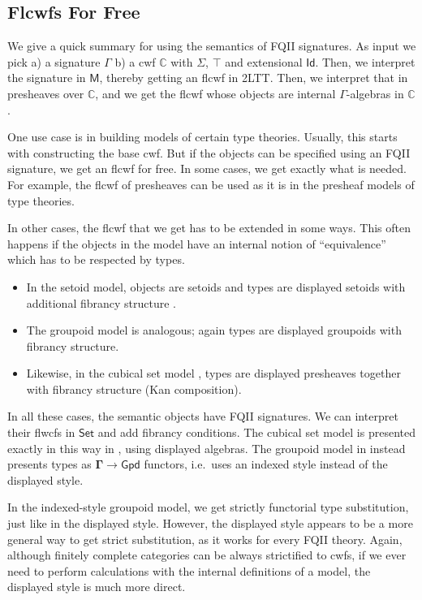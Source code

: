 \documentclass[12pt,a4paper,twoside,openany]{book}
\theoremstyle{remark}
\theoremstyle{definition}
\theoremstyle{theorem}
\newcommand{\ms}[1]{\mathsf{#1}}
\newcommand{\mbb}[1]{\mathbb{#1}}
\newcommand{\bs}[1]{\boldsymbol{#1}}
\newcommand{\Id}{\mathsf{Id}}
\newcommand{\Set}{\mathsf{Set}}
\newcommand{\bM}{\bs{\mathsf{M}}}
\newcommand{\mbbC}{\mbb{C}}
\begin{document}
\subsection{Flcwfs For Free}

We give a quick summary for using the semantics of FQII signatures. As input we
pick a) a signature $\Gamma$ b) a cwf $\mbbC$ with $\Sigma$, $\top$ and
extensional $\Id$. Then, we interpret the signature in $\bM$, thereby getting an
flcwf in 2LTT. Then, we interpret that in presheaves over $\mbbC$, and we get
the flcwf whose objects are internal $\Gamma$-algebras in $\mbbC$.

One use case is in building models of certain type theories. Usually, this
starts with constructing the base cwf. But if the objects can be specified using
an FQII signature, we get an flcwf for free. In some cases, we get exactly
what is needed. For example, the flcwf of presheaves can be used as it is in the
presheaf models of type theories.

In other cases, the flcwf that we get has to be extended in some
ways. This often happens if the objects in the model have an internal notion of
``equivalence'' which has to be respected by types.
\begin{itemize}
  \item In the setoid model, objects are setoids and types are displayed
    setoids with additional fibrancy structure \cite{setoidtt}.
  \item The groupoid model \cite{hofmann96groupoidmodel} is analogous; again types are displayed groupoids
    with fibrancy structure.
  \item Likewise, in the cubical set model \cite{cubical}, types are displayed
    presheaves together with fibrancy structure (Kan composition).
\end{itemize}

In all these cases, the semantic objects have FQII signatures. We can interpret
their flwcfs in $\bs{\Set}$ and add fibrancy conditions. The cubical set model
is presented exactly in this way in \cite{cubical}, using displayed
algebras. The groupoid model in \cite{hofmann96groupoidmodel} instead presents
types as $\bs{\Gamma} \to \bs{\ms{Gpd}}$ functors, i.e.\ uses an indexed style
instead of the displayed style.

In the indexed-style groupoid model, we get strictly functorial type
substitution, just like in the displayed style. However, the displayed style
appears to be a more general way to get strict substitution, as it works for
every FQII theory. Again, although finitely complete categories can be always
strictified to cwfs, if we ever need to perform calculations with the
internal definitions of a model, the displayed style is much more direct.
\end{document}
